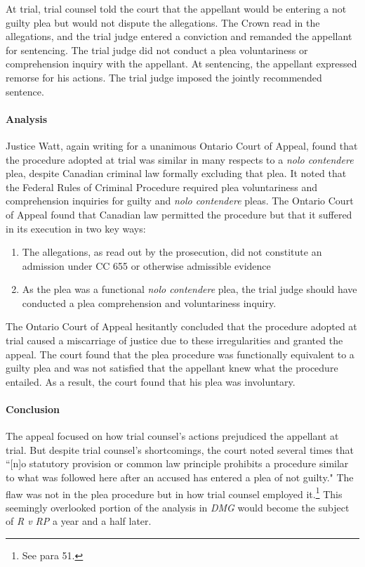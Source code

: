 At trial, trial counsel told the court that the appellant would be entering a not guilty plea but would not dispute the allegations. The Crown read in the allegations, and the trial judge entered a conviction and remanded the appellant for sentencing. The trial judge did not conduct a plea voluntariness or comprehension inquiry with the appellant. At sentencing, the appellant expressed remorse for his actions. The trial judge imposed the jointly recommended sentence.

\paragraph{Analysis\\}

Justice Watt, again writing for a unanimous Ontario Court of Appeal, found that the procedure adopted at trial was similar in many respects to a \textit{nolo contendere} plea, despite Canadian criminal law formally excluding that plea. It noted that the Federal Rules of Criminal Procedure required plea voluntariness and comprehension inquiries for guilty and \textit{nolo contendere} pleas. The Ontario Court of Appeal found that Canadian law permitted the procedure but that it suffered in its execution in two key ways:

\begin{enumerate}
    \item The allegations, as read out by the prosecution, did not constitute an admission under CC 655 or otherwise admissible evidence
    \item As the plea was a functional \textit{nolo contendere} plea, the trial judge should have conducted a plea comprehension and voluntariness inquiry.
\end{enumerate}

The Ontario Court of Appeal hesitantly concluded that the procedure adopted at trial caused a miscarriage of justice due to these irregularities and granted the appeal. The court found that the plea procedure was functionally equivalent to a guilty plea and was not satisfied that the appellant knew what the procedure entailed. As a result, the court found that his plea was involuntary.

\paragraph{Conclusion\\}

The appeal focused on how trial counsel's actions prejudiced the appellant at trial. But despite trial counsel's shortcomings, the court noted several times that ``[n]o statutory provision or common law principle prohibits a procedure similar to what was followed here after an accused has entered a plea of not guilty." The flaw was not in the plea procedure but in how trial counsel employed it.\footnote{See para 51.} This seemingly overlooked portion of the analysis in \textit{DMG} would become the subject of \textit{R v RP} a year and a half later.

